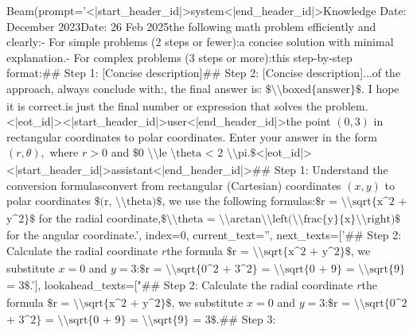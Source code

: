 Beam(prompt='<|start_header_id|>system<|end_header_id|>\n\nCutting Knowledge Date: December 2023\nToday Date: 26 Feb 2025\n\nSolve the following math problem efficiently and clearly:\n\n- For simple problems (2 steps or fewer):\nProvide a concise solution with minimal explanation.\n\n- For complex problems (3 steps or more):\nUse this step-by-step format:\n\n## Step 1: [Concise description]\n\n## Step 2: [Concise description]\n\n...\n\nRegardless of the approach, always conclude with:\n\nTherefore, the final answer is: $\\boxed{answer}$. I hope it is correct.\n\nWhere [answer] is just the final number or expression that solves the problem.<|eot_id|><|start_header_id|>user<|end_header_id|>\n\nConvert the point $(0,3)$ in rectangular coordinates to polar coordinates.  Enter your answer in the form $(r,\theta),$ where $r > 0$ and $0 \\le \theta < 2 \\pi.$<|eot_id|><|start_header_id|>assistant<|end_header_id|>\n\n## Step 1: Understand the conversion formulas\nTo convert from rectangular (Cartesian) coordinates $(x, y)$ to polar coordinates $(r, \\theta)$, we use the following formulas:\n$r = \\sqrt{x^2 + y^2}$ for the radial coordinate,\n$\\theta = \\arctan\\left(\\frac{y}{x}\\right)$ for the angular coordinate.\n\n', index=0, current_text='', next_texts=['## Step 2: Calculate the radial coordinate $r$\nUsing the formula $r = \\sqrt{x^2 + y^2}$, we substitute $x = 0$ and $y = 3$:\n$r = \\sqrt{0^2 + 3^2} = \\sqrt{0 + 9} = \\sqrt{9} = 3$.\n\n'], lookahead_texts=["## Step 2: Calculate the radial coordinate $r$\nUsing the formula $r = \\sqrt{x^2 + y^2}$, we substitute $x = 0$ and $y = 3$:\n$r = \\sqrt{0^2 + 3^2} = \\sqrt{0 + 9} = \\sqrt{9} = 3$.\n\n## Step 3: 